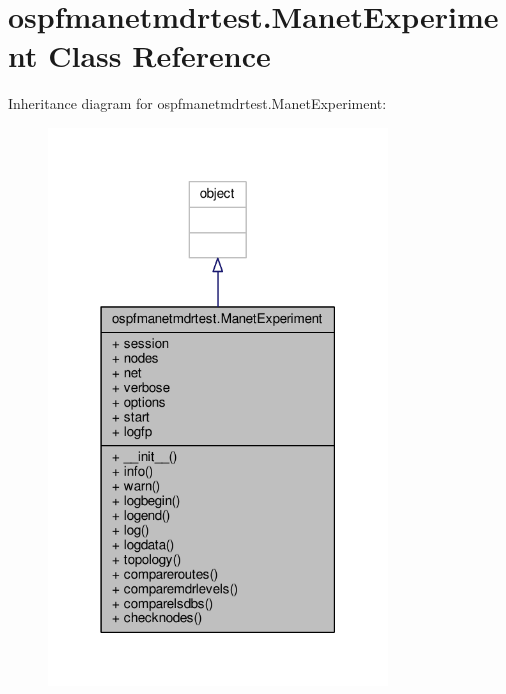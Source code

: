 \hypertarget{classospfmanetmdrtest_1_1_manet_experiment}{\section{ospfmanetmdrtest.\+Manet\+Experiment Class Reference}
\label{classospfmanetmdrtest_1_1_manet_experiment}
}


Inheritance diagram for ospfmanetmdrtest.\+Manet\+Experiment\+:
\nopagebreak
\begin{figure}[H]
\begin{center}
\leavevmode
\includegraphics[width=255pt]{classospfmanetmdrtest_1_1_manet_experiment__inherit__graph}
\end{center}
\end{figure}


